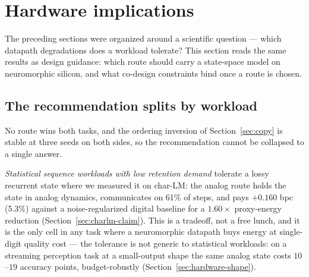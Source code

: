 
\section{Hardware implications}
\label{sec:hardware}

The preceding sections were organized around a scientific question --- which datapath
degradations does a workload tolerate? This section reads the same results as design
guidance: which route should carry a state-space model on neuromorphic silicon, and what
co-design constraints bind once a route is chosen.

\subsection{The recommendation splits by workload}
\label{sec:hardware-split}

No route wins both tasks, and the ordering inversion of Section~\ref{sec:copy} is stable at
three seeds on both sides, so the recommendation cannot be collapsed to a single answer.

\emph{Statistical sequence workloads with low retention demand} tolerate a lossy recurrent
state where we measured it on char-LM: the analog route holds the state in analog dynamics,
communicates on 61\% of steps, and pays $+0.160$ bpc (5.3\%) against a noise-regularized
digital baseline for a $1.60\times$ proxy-energy reduction
(Section~\ref{sec:charlm-claim}). This is a tradeoff, not a free lunch, and it is the only
cell in any task where a neuromorphic datapath buys energy at single-digit quality cost ---
the tolerance is not generic to statistical workloads: on a streaming perception task at a
small-output shape the same analog state costs $10$--$19$ accuracy points, budget-robustly
(Section~\ref{sec:hardware-shape}).

